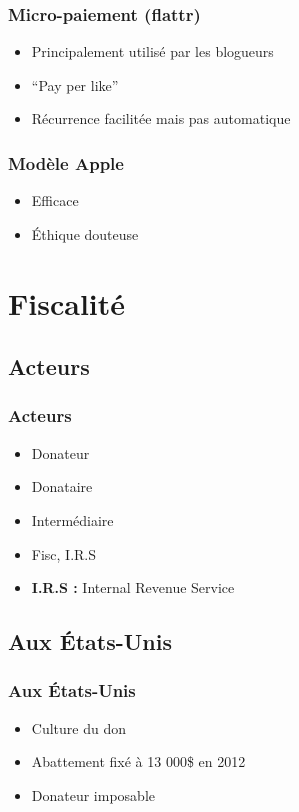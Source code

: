 \begin{frame}
\frametitle{Micro-paiement (flattr)}

\begin{itemize}
    \itemsep1.5em
    \item Principalement utilisé par les blogueurs
    \item ``Pay per like''
    \item Récurrence facilitée mais pas automatique
\end{itemize}
\end{frame}


\begin{frame}
\frametitle{Modèle Apple}

\begin{itemize}
    \itemsep1.5em
    \item Efficace
    \item Éthique douteuse
\end{itemize}
\end{frame}


    \section{Fiscalité}

    \subsection{Acteurs}


\begin{frame}
\frametitle{Acteurs}

\begin{itemize}
    \itemsep1.5em
    \item Donateur
    \item Donataire
    \item Intermédiaire
    \item Fisc, I.R.S
    \item \textbf{I.R.S :} Internal Revenue Service
\end{itemize}
\end{frame}


    \subsection{Aux États-Unis}

\begin{frame}
\frametitle{Aux États-Unis}

\begin{itemize}
    \itemsep1.5em
    \item Culture du don
    \item Abattement fixé à 13 000\${} en 2012
    \item Donateur imposable
\end{itemize}
\end{frame}


